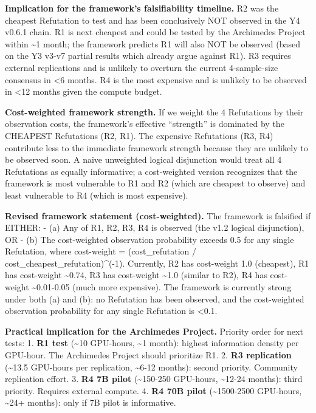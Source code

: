 \documentclass[
]{article}
\begin{document}
\textbf{Implication for the framework's falsifiability timeline.} R2 was
the cheapest Refutation to test and has been conclusively NOT observed
in the Y4 v0.6.1 chain. R1 is next cheapest and could be tested by the
Archimedes Project within \textasciitilde1 month; the framework predicts
R1 will also NOT be observed (based on the Y3 v3-v7 partial results
which already argue against R1). R3 requires external replications and
is unlikely to overturn the current 4-sample-size consensus in
\textless6 months. R4 is the most expensive and is unlikely to be
observed in \textless12 months given the compute budget.

\textbf{Cost-weighted framework strength.} If we weight the 4
Refutations by their observation costs, the framework's effective
``strength'' is dominated by the CHEAPEST Refutations (R2, R1). The
expensive Refutations (R3, R4) contribute less to the immediate
framework strength because they are unlikely to be observed soon. A
naive unweighted logical disjunction would treat all 4 Refutations as
equally informative; a cost-weighted version recognizes that the
framework is most vulnerable to R1 and R2 (which are cheapest to
observe) and least vulnerable to R4 (which is most expensive).

\textbf{Revised framework statement (cost-weighted).} The framework is
falsified if EITHER: - (a) Any of R1, R2, R3, R4 is observed (the v1.2
logical disjunction), OR - (b) The cost-weighted observation probability
exceeds 0.5 for any single Refutation, where cost-weight =
(cost\_refutation / cost\_cheapest\_refutation)\^{}(-1). Currently, R2
has cost-weight 1.0 (cheapest), R1 has cost-weight \textasciitilde0.74,
R3 has cost-weight \textasciitilde1.0 (similar to R2), R4 has
cost-weight \textasciitilde0.01-0.05 (much more expensive). The
framework is currently strong under both (a) and (b): no Refutation has
been observed, and the cost-weighted observation probability for any
single Refutation is \textless0.1.

\textbf{Practical implication for the Archimedes Project.} Priority
order for next tests: 1. \textbf{R1 test} (\textasciitilde10 GPU-hours,
\textasciitilde1 month): highest information density per GPU-hour. The
Archimedes Project should prioritize R1. 2. \textbf{R3 replication}
(\textasciitilde13.5 GPU-hours per replication, \textasciitilde6-12
months): second priority. Community replication effort. 3. \textbf{R4 7B
pilot} (\textasciitilde150-250 GPU-hours, \textasciitilde12-24 months):
third priority. Requires external compute. 4. \textbf{R4 70B pilot}
(\textasciitilde1500-2500 GPU-hours, \textasciitilde24+ months): only if
7B pilot is informative.
\end{document}

